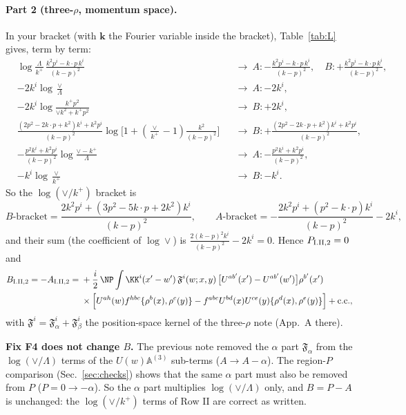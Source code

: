 \paragraph{Part 2 (three-$\rho$, momentum space).} In your bracket (with $\mathbf k$ the Fourier variable inside the bracket), Table~\ref{tab:L} gives, term by term:
\begin{align*}
&\log\tfrac{\Lambda}{k^+}\,\tfrac{k^2p^i-k\cdot p\,k^i}{(k-p)^2}&&\to\ A:-\tfrac{k^2p^i-k\cdot p\,k^i}{(k-p)^2},\quad B:+\tfrac{k^2p^i-k\cdot p\,k^i}{(k-p)^2},\\
&-2k^i\log\tfrac{\vee}{\Lambda}&&\to\ A:-2k^i,\\
&-2k^i\log\tfrac{k^+p^2}{\vee k^2+k^+p^2}&&\to\ B:+2k^i,\\
&\tfrac{(2p^2-2k\cdot p+k^2)k^i+k^2p^i}{(k-p)^2}\log\big[1+(\tfrac{\vee}{k^+}-1)\tfrac{k^2}{(k-p)^2}\big]&&\to\ B:+\tfrac{(2p^2-2k\cdot p+k^2)k^i+k^2p^i}{(k-p)^2},\\
&-\tfrac{p^2k^i+k^2p^i}{(k-p)^2}\log\tfrac{\vee-k^+}{\Lambda}&&\to\ A:-\tfrac{p^2k^i+k^2p^i}{(k-p)^2},\\
&-k^i\log\tfrac{\vee}{k^+}&&\to\ B:-k^i.
\end{align*}
So the $\log(\vee/k^+)$ bracket is
\begin{equation}
B\text{-bracket}=\frac{2k^2p^i+(3p^2-5k\cdot p+2k^2)k^i}{(k-p)^2},\qquad A\text{-bracket}=-\frac{2k^2p^i+(p^2-k\cdot p)k^i}{(k-p)^2}-2k^i,
\end{equation}
and their sum (the coefficient of $\log\vee$) is $\frac{2(k-p)^2k^i}{(k-p)^2}-2k^i=0$. Hence $P_{\rm I.II,2}=0$ and
\begin{align}
B_{\rm I.II,2}=-A_{\rm I.II,2}={}&+\frac{i}{2}\,\NP\int\KK^i(x'-w')\,\mathfrak F^i(w;x,y)\,\big[U^{ab'}(x')-U^{ab'}(w')\big]\rho^{b'}(x')\notag\\
&\times\Big[U^{ah}(w)f^{hbc}\{\rho^b(x),\rho^c(y)\}-f^{abc}U^{bd}(x)U^{ce}(y)\{\rho^d(x),\rho^e(y)\}\Big]+{\rm c.c.},
\end{align}
with $\mathfrak F^i=\mathfrak F^i_\alpha+\mathfrak F^i_\beta$ the position-space kernel of the three-$\rho$ note (App.~A there).

\textbf{Fix F4 does not change $B$.} The previous note removed the $\alpha$ part $\mathfrak F_\alpha$ from the $\log(\vee/\Lambda)$ terms of the $U(w)\mathbb A^{(3)}$ sub-terms ($A\to A-\alpha$). The region-$P$ comparison (Sec.~\ref{sec:checks}) shows that the same $\alpha$ part must also be removed from $P$ ($P=0\to-\alpha$). So the $\alpha$ part multiplies $\log(\vee/\Lambda)$ only, and $B=P-A$ is unchanged: the $\log(\vee/k^+)$ terms of Row II are correct as written.

